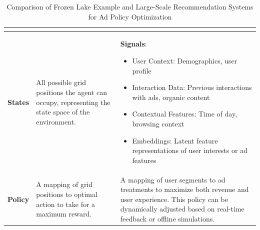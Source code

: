 \documentclass[final]{anthology-ch}         %
\begin{document}
\begin{table}[ht]
\begin{tabular}{|>{\centering\arraybackslash}p{3cm}|p{3.5cm}|p{9cm}|}
\begin{itemize}
        \end{itemize} \\
        \hline
        \textbf{States} & All possible grid positions the agent can occupy, representing the state space of the environment. & 
        \textbf{Signals}:
        \begin{itemize}
            \item User Context: Demographics, user profile
            \item Interaction Data: Previous interactions with ads, organic content
            \item Contextual Features: Time of day, browsing context
            \item Embeddings: Latent feature representations of user interests or ad features
        \end{itemize} \\
        \hline
        \textbf{Policy} & A mapping of grid positions to optimal action to take for a maximum reward. & 
        A mapping of user segments to ad treatments to maximize both revenue and user experience. This policy can be dynamically adjusted based on real-time feedback or offline simulations. \\ 
        \hline
    \end{tabular}
    \caption{Comparison of Frozen Lake Example and Large-Scale Recommendation Systems for Ad Policy Optimization}
    \label{tab:comparison}
\end{table}
\end{document}
